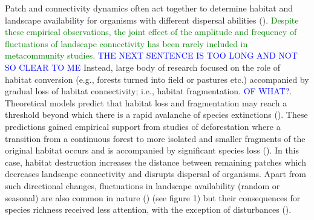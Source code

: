 \documentclass[12pt]{article}
\newcommand{\GM}[1]{\textcolor{Blue}{#1}}
\newcommand{\JK}[1]{\textcolor{Green}{#1}}
\begin{document}
Patch and connectivity dynamics often act together to determine habitat and landscape availability for organisms with different dispersal abilities (\cite{LauranceEtAl1997, Hanski1999, DebinskiHolt2000, KattwinkelEtAl2009, MetzgerEtAl2009}). \JK{Despite these empirical observations, the joint effect of the amplitude and frequency of fluctuations of landscape connectivity has been rarely included in metacommunity studies.} \GM{THE NEXT SENTENCE IS TOO LONG AND NOT SO CLEAR TO ME} Instead, large body of research focused on the role of habitat conversion (e.g., forests turned into field or pastures etc.) accompanied by gradual loss of habitat connectivity; i.e., habitat fragmentation. \GM{OF WHAT?}. Theoretical models predict that habitat loss and fragmentation may reach a threshold beyond which there is a rapid avalanche of species extinctions (\cite{fahrig2002,ovaskainenhanski2003,rybickihanski2013}). These predictions gained empirical support from studies of deforestation where a transition from a continuous forest to more isolated and smaller fragments of the original habitat occurs and is accompanied by significant species loss (\cite{LauranceEtAl1997, MetzgerEtAl2009}). In this case, habitat destruction increases the distance between remaining patches which decreases landscape connectivity and disrupts dispersal of organisms. Apart from such directional changes, fluctuations in landscape availability (random or seasonal) are also common in nature (\cite{Sprugel1991, RuizEtAl2014}) (see figure 1) but their consequences for species richness received less attention, with the exception of disturbances (\cite{Sousa1984, SuppErnest2014}).
\end{document}
